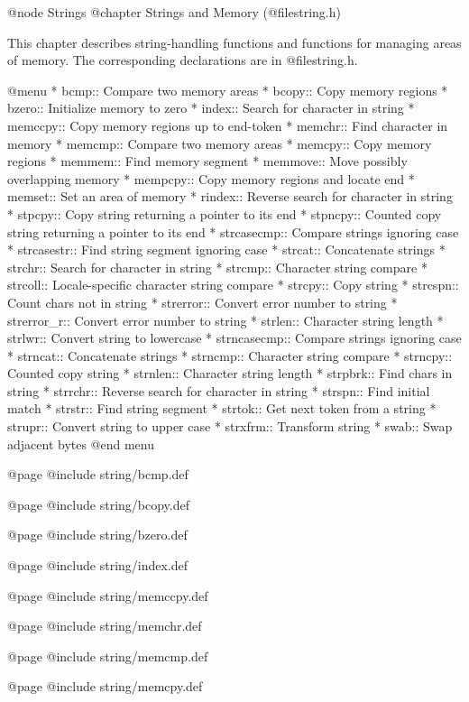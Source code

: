 @node Strings
@chapter Strings and Memory (@file{string.h})

This chapter describes string-handling functions and functions for
managing areas of memory.  The corresponding declarations are in
@file{string.h}.

@menu
* bcmp::        Compare two memory areas
* bcopy::       Copy memory regions
* bzero::       Initialize memory to zero
* index::       Search for character in string
* memccpy::     Copy memory regions up to end-token
* memchr::      Find character in memory
* memcmp::      Compare two memory areas
* memcpy::      Copy memory regions
* memmem::      Find memory segment
* memmove::     Move possibly overlapping memory
* mempcpy::	Copy memory regions and locate end
* memset::      Set an area of memory
* rindex::      Reverse search for character in string
* stpcpy::      Copy string returning a pointer to its end
* stpncpy::     Counted copy string returning a pointer to its end
* strcasecmp::	Compare strings ignoring case
* strcasestr::	Find string segment ignoring case
* strcat::      Concatenate strings
* strchr::      Search for character in string
* strcmp::      Character string compare
* strcoll::     Locale-specific character string compare
* strcpy::      Copy string
* strcspn::     Count chars not in string
* strerror::    Convert error number to string
* strerror_r::  Convert error number to string
* strlen::      Character string length
* strlwr::	Convert string to lowercase
* strncasecmp::	Compare strings ignoring case
* strncat::     Concatenate strings
* strncmp::     Character string compare
* strncpy::     Counted copy string
* strnlen::     Character string length
* strpbrk::     Find chars in string
* strrchr::     Reverse search for character in string
* strspn::      Find initial match
* strstr::      Find string segment
* strtok::      Get next token from a string
* strupr::	Convert string to upper case
* strxfrm::     Transform string
* swab::        Swap adjacent bytes
@end menu

@page
@include string/bcmp.def

@page
@include string/bcopy.def

@page
@include string/bzero.def

@page
@include string/index.def

@page
@include string/memccpy.def

@page
@include string/memchr.def

@page
@include string/memcmp.def

@page
@include string/memcpy.def

